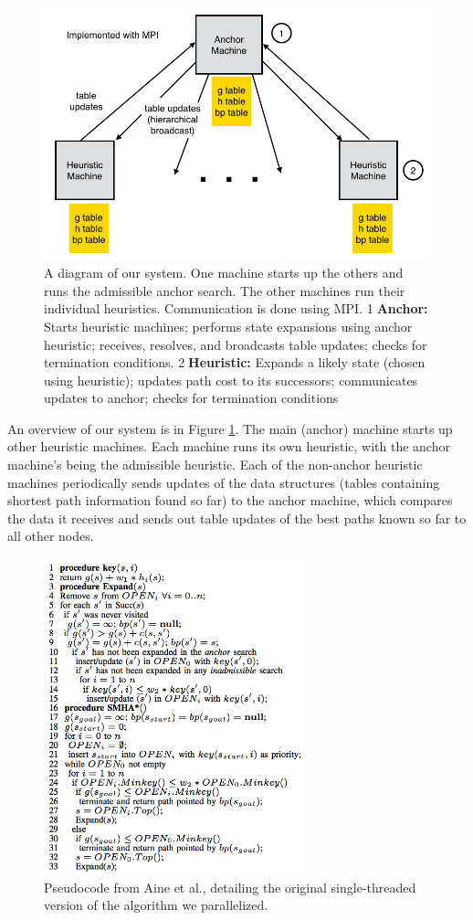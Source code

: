 \documentclass{article}
\begin{document}
\begin{figure}
\centering \includegraphics[width=5.0in]{system-diagram}
\caption{A diagram of our system. One machine starts up the others and runs the admissible anchor search. The other machines run their individual heuristics. Communication is done using MPI. 
\textcircled{1}\textbf{Anchor:} Starts heuristic machines; performs state expansions using anchor heuristic; receives, resolves, and broadcasts table updates; checks for termination conditions. \textcircled{2}\textbf{Heuristic:} Expands a likely state (chosen using heuristic); updates path cost to its successors; communicates updates to anchor; checks for termination conditions}
\label{fig:sysdiag}
\end{figure}

An overview of our system is in Figure \ref{fig:sysdiag}. The main (anchor) machine starts up other heuristic machines. Each machine runs its own heuristic, with the anchor machine's being the admissible heuristic. Each of the non-anchor heuristic machines periodically sends updates of the data structures (tables containing shortest path information found so far) to the anchor machine, which compares the data it receives and sends out table updates of the best paths known so far to all other nodes.

\begin{figure}
\centering \includegraphics[width=3in]{pseudocode}
\caption{Pseudocode from Aine et al., detailing the original single-threaded version of the algorithm we parallelized.}
\label{fig:pseudocode}
\end{figure}
\end{document}
